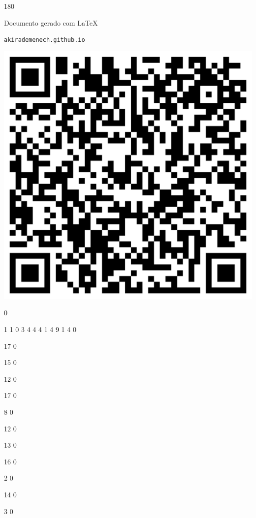 \documentclass[12pt]{article}
\begin{document}
	\begin{turn}{180}	
		\begin{minipage}{\textwidth}		  
		  Documento gerado com \LaTeX			
		  
		  \texttt{akirademenech.github.io}

		  \includegraphics[height=0.3\textheight]{2e-2.pdf}

		\end{minipage}	
	\end{turn}  
		  
		\vfill  
		  
{
	0	%

	1	%
	1	%
	0	%
	3	%
	4	%
	4	%
	4	%
	1	%
	4	%
	9	%
	1	%
	4	%
	0	%

	17	%
	0	%

	15	%
	0	%

	12	%
	0	%

	17	%
	0	%

	8	%
	0	%

	12	%
	0	%

	13	%
	0	%

	16	%
	0	%

	2	%
	0	%

	14	%
	0	%

	3	%
	0	%

}	  
		    	
\end{document}
